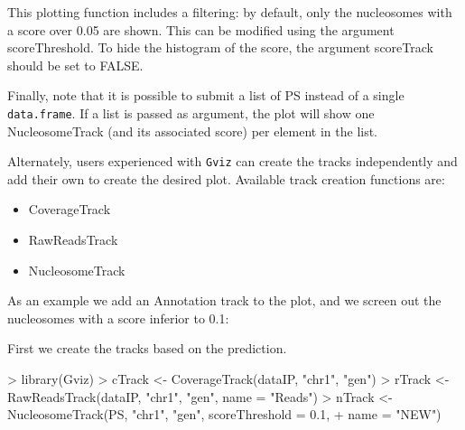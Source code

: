 \documentclass[11pt]{article}
\begin{document}
This plotting function includes a filtering: by default, only the nucleosomes with a score over 0.05 are shown. This can be modified using the argument scoreThreshold. To hide the histogram of the score, the argument scoreTrack should be set to FALSE.

Finally, note that it is possible to submit a list of PS instead of a single \texttt{data.frame}. If a list is passed as argument, the plot will show one NucleosomeTrack (and its associated score) per element in the list.

\vspace{10pt}
Alternately, users experienced with \texttt{Gviz} can create the tracks
independently and add their own to create the desired plot.
Available track creation functions are:
\begin{itemize}
\item CoverageTrack
\item RawReadsTrack
\item NucleosomeTrack
\end{itemize}

As an example we add an Annotation track to the plot, and we screen out the nucleosomes with a score inferior to 0.1:

First we create the tracks based on the prediction.
\begin{Schunk}
\begin{Sinput}
> library(Gviz)
> cTrack <- CoverageTrack(dataIP, "chr1", "gen")
> rTrack <- RawReadsTrack(dataIP, "chr1", "gen", name = "Reads")
> nTrack <- NucleosomeTrack(PS, "chr1", "gen", scoreThreshold = 0.1, 
+     name = "NEW")
\end{Sinput}
\end{Schunk}
\end{document}
